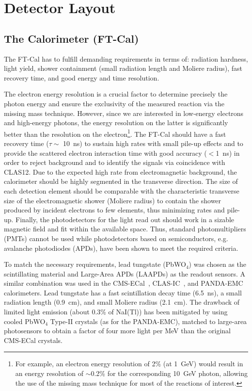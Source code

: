 \section{Detector Layout}

\subsection{The Calorimeter (FT-Cal)}

The FT-Cal has to fulfill demanding requirements in terms of: radiation hardness, light yield, shower containment
(small radiation length and Moliere radius), fast recovery time, and good energy and time resolution.

The electron energy resolution is a crucial factor to determine precisely the photon energy and ensure the
exclusivity of the measured reaction via the missing mass technique. However, since we are interested in low-energy
electrons and high-energy photons, the energy resolution on the latter is significantly better than the resolution on
the electron\footnote {For example, an electron energy resolution of 2\% (at 1~GeV) would result in an energy
  resolution of $\sim$0.2\% for the corresponding 10~GeV photon, allowing the use of the missing mass technique
  for most of the reactions of interest.}. The FT-Cal should have a fast recovery time ($\tau\sim$ 10~ns) to sustain
high rates with small pile-up effects and to provide the scattered electron interaction time with good accuracy
($<$1~ns) in order to reject background and to identify the signals via coincidence with CLAS12. Due to the
expected high rate from electromagnetic background, the calorimeter should be highly segmented in the transverse
direction. The size of each detection element should be comparable with the characteristic transverse size of the
electromagnetic shower (Moliere radius) to contain the shower produced by incident electrons to few elements,
thus minimizing rates and pile-up. Finally, the photodetectors for the light read out should work  in a sizable magnetic
field and fit within the available space. Thus, standard photomultipliers (PMTs) cannot be used while photodetectors
based on semiconductors, e.g. avalanche photodiodes (APDs), have been shown to meet the required criteria. 

To match the necessary requirements, lead tungstate (PbWO$_4$) was chosen as the scintillating material and
Large-Area APDs (LAAPDs) as the readout sensors. A similar  combination was used in the CMS-ECal~\cite{CMS-ECal},
CLAS-IC~\cite{CLAS-IC}, and PANDA-EMC~\cite{PANDA-ECal} calorimeters. Lead tungstate has a fast scintillation
decay time (6.5~ns), a small radiation length (0.9~cm), and small Moliere radius (2.1~cm). The drawback of limited
light emission (about 0.3\% of NaI(Tl)) has been mitigated by using cooled PbWO$_4$ Type-II crystals (as for the
PANDA-EMC), matched to large-area photosensors to obtain a factor of four more light per MeV than the original
CMS-ECal crystals.

